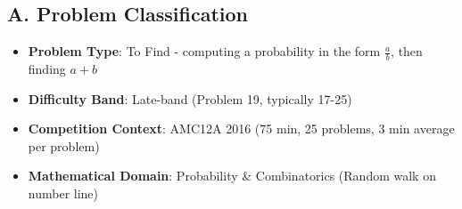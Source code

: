 \documentclass[]{article}
\begin{document}
\begin{problemconfigbox}
\subsection*{A. Problem Classification}
\begin{itemize}[leftmargin=*]
    \item \textbf{Problem Type}: To Find - computing a probability in the form $\frac{a}{b}$, then finding $a+b$
    \item \textbf{Difficulty Band}: Late-band (Problem 19, typically 17-25)
    \item \textbf{Competition Context}: AMC12A 2016 (75 min, 25 problems, 3 min average per problem)
    \item \textbf{Mathematical Domain}: Probability \& Combinatorics (Random walk on number line)
\end{itemize}


\end{problemconfigbox}
\end{document}
